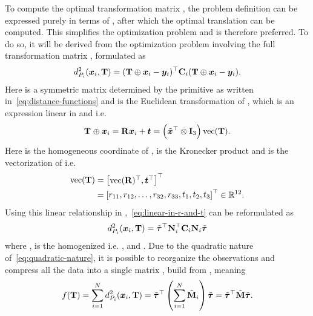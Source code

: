 To compute the optimal transformation matrix \tf[T]{\star}{}, the problem definition can be expressed purely in terms of \tf[R]{}{}, after which the optimal translation  can be computed. This simplifies the optimization problem and is therefore preferred. To do so, it will be derived from the optimization problem involving the full transformation matrix \tf[T]{}{}, formulated as
%
\begin{equation}\label{eq:linear-in-r-and-t}
	d_{P_i}^2(\vec{x}_i, \mat{T})=(\mat{T}\oplus \vec{x}_i - \vec{y}_i)^\T\mat{C}_i (\mat{T}\oplus \vec{x}_i - \vec{y}_i).
\end{equation}
Here  is a symmetric matrix determined by the primitive as written in~\eqref{eq:distance-functions} and  is the Euclidean transformation of , which is an expression linear in \tf[R]{}{} and  i.e.
%
\begin{equation}
	\tf[T]{}{} \oplus \vec{x}_i = \mat{R}\vec{x}_i + \vec{t} = \left( \tilde{\vec{x}}^\T \otimes \mat{I}_3\right) \text{vec}(\mat{T}).
\end{equation}
Here  is the homogeneous coordinate of , \mvar{\otimes} is the Kronecker product and  is the vectorization of  i.e.
%
\begin{align}
	\text{vec}(\mat{T}) &= \rvec{\text{vec}(\mat{R})^\T, \vec{t}^\T}^\T \\
	&= \rvec{r_{11},r_{12},\dots,r_{32},r_{33},t_{1},t_{2},t_{3}}^\T \inR{12}.
\end{align}
Using this linear relationship in ,~\eqref{eq:linear-in-r-and-t} can be reformulated as 
%
\begin{equation}\label{eq:quadratic-nature}
	d_{P_i}^2(\vec{x}_i,\mat{T})=\tilde{\vec{\tau}}^\T \mat{N}_i^\T \mat{C}_i \mat{N}_i \tilde{\vec{\tau}}
\end{equation}
where , \mvar{\tilde{\vec{\tau}}} is the homogenized  i.e. , and . Due to the quadratic nature of~\eqref{eq:quadratic-nature}, it is possible to reorganize the observations and compress all the data into a single matrix , build from , meaning 
%
\begin{equation}
	f(\mat{T})=\sum^N_{i=1} d_{P_i}^2(\vec{x}_i,\mat{T})=\tilde{\vec{\tau}}^\T \left( \sum^N_{i=1} \tilde{\mat{M}}_i \right) \tilde{\vec{\tau}} = \tilde{\vec{\tau}}^\T \tilde{\mat{M}} \tilde{\vec{\tau}}.
\end{equation}
